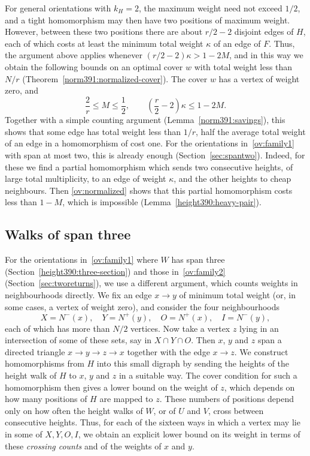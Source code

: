 For general orientations with $k_H=2$, the maximum weight need not exceed $1/2$, and a tight homomorphism may then have two positions of maximum weight. However, between these two positions there are about $r/2-2$ disjoint edges of $H$, each of which costs at least the minimum total weight $\kappa$ of an edge of $F$. Thus, the argument above applies whenever $(r/2-2)\kappa>1-2M$, and in this way we obtain the following bounds on an optimal cover $w$ with total weight less than $N/r$ (Theorem~\ref{norm391:normalized-cover}). The cover $w$ has a vertex of weight zero, and
\begin{equation}\label{ov:normalized}
 \frac 2r\le M\le\frac12,\qquad \left(\frac r2-2\right)\kappa\le 1-2M.
\end{equation}
Together with a simple counting argument (Lemma~\ref{norm391:savings}), this shows that some edge has total weight less than $1/r$, half the average total weight of an edge in a homomorphism of cost one.
For the orientations in~\ref{ov:family1} with span at most two, this is already enough (Section~\ref{sec:spantwo}). Indeed, for these we find a partial homomorphism which sends two consecutive heights, of large total multiplicity, to an edge of weight $\kappa$, and the other heights to cheap neighbours. Then \eqref{ov:normalized} shows that this partial homomorphism costs less than $1-M$, which is impossible (Lemma~\ref{height390:heavy-pair}).

\subsection{Walks of span three}\label{sec:sketch-spanthree}
For the orientations in~\ref{ov:family1} where $W$ has span three (Section~\ref{height390:three-section}) and those in~\ref{ov:family2} (Section~\ref{sec:tworeturns}), we use a different argument, which counts weights in neighbourhoods directly.
We fix an edge $x\to y$ of minimum total weight (or, in some cases, a vertex of weight zero), and consider the four neighbourhoods
\[
 X=N^-(x),\quad Y=N^+(y),\quad O=N^+(x),\quad I=N^-(y),
\]
each of which has more than $N/2$ vertices.
Now take a vertex $z$ lying in an intersection of some of these sets, say in $X\cap Y\cap O$. Then $x$, $y$ and $z$ span a directed triangle $x\to y\to z\to x$ together with the edge $x\to z$. We construct homomorphisms from $H$ into this small digraph by sending the heights of the height walk of $H$ to $x$, $y$ and $z$ in a suitable way. The cover condition for such a homomorphism then gives a lower bound on the weight of $z$, which depends on how many positions of $H$ are mapped to $z$.
These numbers of positions depend only on how often the height walks of $W$, or of $U$ and $V$, cross between consecutive heights. Thus, for each of the sixteen ways in which a vertex may lie in some of $X,Y,O,I$, we obtain an explicit lower bound on its weight in terms of these \emph{crossing counts} and of the weights of $x$ and $y$.

